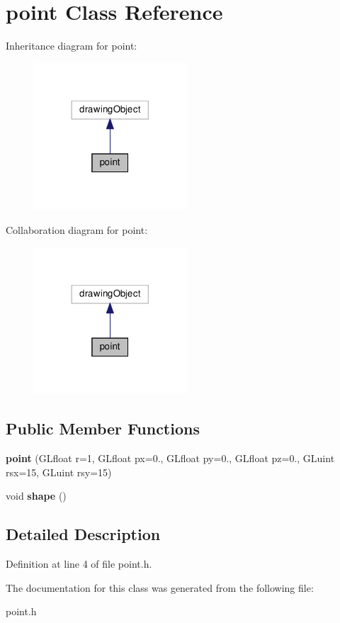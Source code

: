 \hypertarget{classpoint}{}\section{point Class Reference}
\label{classpoint}


Inheritance diagram for point\+:\nopagebreak
\begin{figure}[H]
\begin{center}
\leavevmode
\includegraphics[width=161pt]{classpoint__inherit__graph}
\end{center}
\end{figure}


Collaboration diagram for point\+:\nopagebreak
\begin{figure}[H]
\begin{center}
\leavevmode
\includegraphics[width=161pt]{classpoint__coll__graph}
\end{center}
\end{figure}
\subsection*{Public Member Functions}
\begin{DoxyCompactItemize}
\item 
\mbox{\label{classpoint_a5e1930bd8f6ebae2e840c1836b2e2875}} 
{\bfseries point} (G\+Lfloat r=1, G\+Lfloat px=0., G\+Lfloat py=0., G\+Lfloat pz=0., G\+Luint rsx=15, G\+Luint rsy=15)
\item 
\mbox{\label{classpoint_adb291571b18314e925e810f3a4340520}} 
void {\bfseries shape} ()
\end{DoxyCompactItemize}


\subsection{Detailed Description}


Definition at line 4 of file point.\+h.



The documentation for this class was generated from the following file\+:\begin{DoxyCompactItemize}
\item 
point.\+h\end{DoxyCompactItemize}
